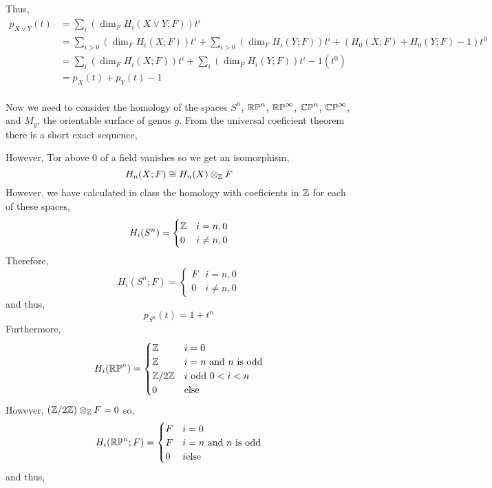 \documentclass[12pt]{extarticle}
\begin{document}
Thus,
\begin{align*} 
p_{X \vee Y} (t) & = \sum_{i} \left( \dim_F{H_i(X \vee Y ; F)} \right) t^i
\\
& = \sum_{i > 0} \left( \dim_{F}{ H_i(X ; F) } \right) t^i + \sum_{i > 0} \left( \dim_{F}{ H_i(Y ; F) } \right) t^i + \left( H_0(X ; F) + H_0(Y ; F) - 1 \right) t^0 
\\
& = \sum_{i} \left( \dim_{F}{ H_i(X ; F) } \right) t^i + \sum_{i} \left( \dim_{F}{ H_i(Y ; F) } \right) t^i - 1 (t^0)
\\
& = p_X(t) + p_Y(t) - 1 
\end{align*}
\bigskip\\
Now we need to consider the homology of the spaces $S^n$, $\mathbb{RP}^n$, $\mathbb{RP}^\infty$, $\mathbb{CP}^n$, $\mathbb{CP}^\infty$, and $M_g$, the orientable surface of genus $g$. 
From the universal coeficient theorem there is a short exact sequence,
\begin{center}
\end{center}
However, Tor above $0$ of a field vanishes so we get an isomorphism,
\[ H_n(X ; F) \cong H_n(X) \otimes_{\mathbb{Z}} F \] 
However, we have calculated in class the homology with coeficients in $\mathbb{Z}$ for each of these spaces,
\[ H_i(S^n) = 
\begin{cases}
\mathbb{Z} & i = n, 0  
\\
0 & i \neq n, 0 
\end{cases}
\]
Therefore,
\[ H_i(S^n ; F) = 
\begin{cases}
F & i = n, 0  
\\
0 & i \neq n, 0 
\end{cases}
\]
and thus,
\[ p_{S^n}(t) = 1 + t^n \]
Furthermore,
\[ H_i(\mathbb{RP}^n) = 
\begin{cases}
\mathbb{Z} & i = 0
\\
\mathbb{Z} & i = n \text{ and } n \text{ is odd}
\\
\mathbb{Z}/2\mathbb{Z} & i \text{ odd } 0 < i < n
\\
0 & \text{else}
\end{cases}
\]
However, $(\mathbb{Z} / 2 \mathbb{Z}) \otimes_{\mathbb{Z}} F = 0$ so,
\[ H_i(\mathbb{RP}^n ; F) = 
\begin{cases}
F & i = 0
\\
F & i = n \text{ and } n \text{ is odd}
\\
0 & i \text{else}
\end{cases}
\]
and thus,
\end{document}
